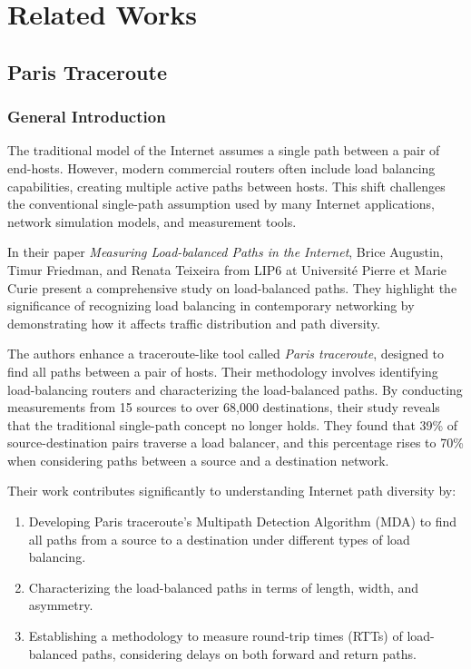 \documentclass[12pt]{cwru_thesis}
\begin{document}







\chapter{Related Works} \label{chap:intro}
\section{Paris Traceroute}

\subsection{General Introduction}
The traditional model of the Internet assumes a single path between a pair of end-hosts. However, modern commercial routers often include load balancing capabilities, creating multiple active paths between hosts. This shift challenges the conventional single-path assumption used by many Internet applications, network simulation models, and measurement tools.

In their paper \textit{Measuring Load-balanced Paths in the Internet}, Brice Augustin, Timur Friedman, and Renata Teixeira from LIP6 at Université Pierre et Marie Curie present a comprehensive study on load-balanced paths. They highlight the significance of recognizing load balancing in contemporary networking by demonstrating how it affects traffic distribution and path diversity.

The authors enhance a traceroute-like tool called \textit{Paris traceroute}, designed to find all paths between a pair of hosts. Their methodology involves identifying load-balancing routers and characterizing the load-balanced paths. By conducting measurements from 15 sources to over 68,000 destinations, their study reveals that the traditional single-path concept no longer holds. They found that 39\% of source-destination pairs traverse a load balancer, and this percentage rises to 70\% when considering paths between a source and a destination network.

Their work contributes significantly to understanding Internet path diversity by:
\begin{enumerate}
    \item Developing Paris traceroute’s Multipath Detection Algorithm (MDA) to find all paths from a source to a destination under different types of load balancing.
    \item Characterizing the load-balanced paths in terms of length, width, and asymmetry.
    \item Establishing a methodology to measure round-trip times (RTTs) of load-balanced paths, considering delays on both forward and return paths.
\end{enumerate}
\end{document}

